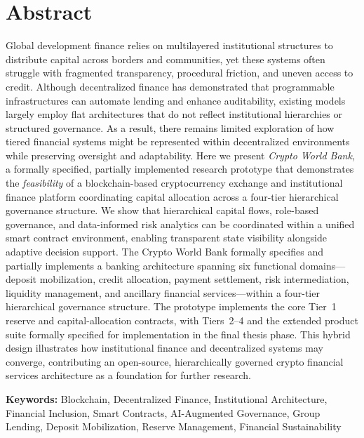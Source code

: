 \documentclass[12pt,a4paper]{report}
\begin{document}
\chapter*{Abstract}
{}

Global development finance relies on multilayered institutional structures to distribute capital across borders and communities, yet these systems often struggle with fragmented transparency, procedural friction, and uneven access to credit. Although decentralized finance has demonstrated that programmable infrastructures can automate lending and enhance auditability, existing models largely employ flat architectures that do not reflect institutional hierarchies or structured governance. As a result, there remains limited exploration of how tiered financial systems might be represented within decentralized environments while preserving oversight and adaptability. Here we present \textit{Crypto World Bank}, a formally specified, partially implemented research prototype that demonstrates the \textit{feasibility} of a blockchain-based cryptocurrency exchange and institutional finance platform coordinating capital allocation across a four-tier hierarchical governance structure. We show that hierarchical capital flows, role-based governance, and data-informed risk analytics can be coordinated within a unified smart contract environment, enabling transparent state visibility alongside adaptive decision support. The Crypto World Bank formally specifies and partially implements a banking architecture spanning six functional domains---deposit mobilization, credit allocation, payment settlement, risk intermediation, liquidity management, and ancillary financial services---within a four-tier hierarchical governance structure. The prototype implements the core Tier~1 reserve and capital-allocation contracts, with Tiers~2--4 and the extended product suite formally specified for implementation in the final thesis phase. This hybrid design illustrates how institutional finance and decentralized systems may converge, contributing an open-source, hierarchically governed crypto financial services architecture as a foundation for further research.

\vspace{0.5em}
\noindent\textbf{Keywords:} Blockchain, Decentralized Finance, Institutional Architecture, Financial Inclusion, Smart Contracts, AI-Augmented Governance, Group Lending, Deposit Mobilization, Reserve Management, Financial Sustainability
\end{document}
